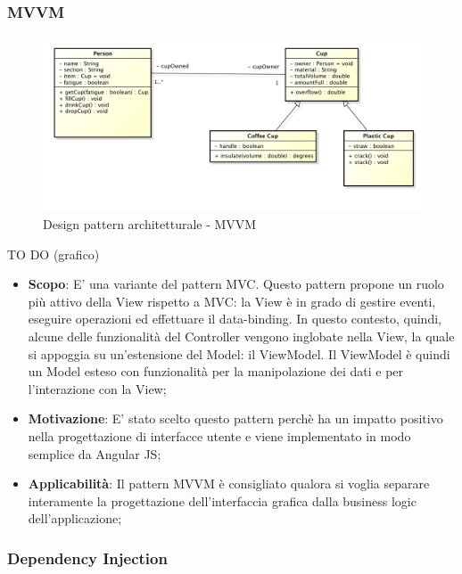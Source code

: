 		
		\newpage
		\subsubsection{MVVM} %
		
		\begin{figure}[htbp]
			\centering
			\centerline{\includegraphics[scale=0.3]{./images/example_graph.png}}
			\caption{Design pattern architetturale - MVVM}
		\end{figure}
		TO DO (grafico)
		
		
		\begin{itemize}
			\item \textbf{Scopo}: E' una variante del pattern MVC. Questo pattern propone un ruolo più attivo della View rispetto a MVC: la View è in grado di gestire eventi, eseguire operazioni ed effettuare il data-binding. In questo contesto, quindi, alcune delle funzionalità del Controller vengono inglobate nella View, la quale si appoggia su un’estensione del Model: il ViewModel.
Il ViewModel è quindi un Model esteso con funzionalità per la manipolazione dei dati e per l’interazione con la View;
			
			\item \textbf{Motivazione}: E' stato scelto questo pattern perchè ha un impatto positivo nella progettazione di interfacce utente e viene implementato in modo semplice da Angular JS;
			
			\item \textbf{Applicabilità}: Il pattern MVVM è consigliato qualora si voglia separare interamente la progettazione dell'interfaccia grafica dalla business logic dell'applicazione;
			
		\end{itemize}
		
		
		\newpage
		\subsubsection{Dependency Injection} %
		

